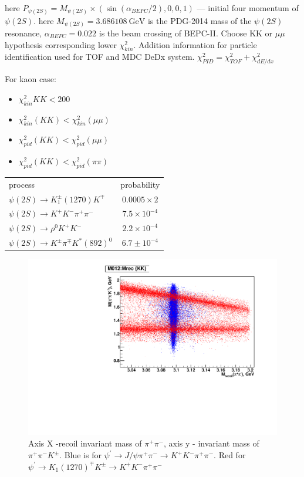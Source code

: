 \documentclass[a4paper,12pt]{article}
\begin{document}
here  $P_{\psi(2S)} = M_{\psi(2S)}\times (\sin(\alpha_{BEPC}/2),0,0, 1)$ ---
initial four momentum of $\psi(2S)$.  here $M_{\psi(2S)} = 3.686108\
\mbox{GeV}$ is the PDG-2014 mass of the $\psi(2S)$ resonance,
$\alpha_{BEPC}=0.022$ is the beam crossing of BEPC-II. Choose KK or $\mu\mu$
hypothesis corresponding lower $\chi^2_{kin}$. Addition information for
particle identification used for TOF and MDC DeDx system.
$\chi^2_{PID} = \chi^2_{TOF} + \chi^2_{dE/dx}$

For kaon case:
\begin{itemize}
	\item $\chi^2_{kin}{KK} <200$
	\item $\chi^2_{kin}(KK) < \chi^2_{kin}(\mu\mu)$
	\item $\chi^2_{pid}(KK) < \chi^2_{pid}(\mu\mu)$
	\item $\chi^2_{pid}(KK) < \chi^2_{pid}(\pi\pi)$
\end{itemize}


\begin{table}
	\begin{tabular}{lc} \hline
		process &  probability \\ 
		$\psi(2S) \to K_1^{\pm}(1270) K^{\mp}$  & $0.0005 \times 2$ \\ 
		$\psi(2S) \to K^+K^-\pi^+\pi^-$   & $7.5 \times 10^{-4}$  \\
		$\psi(2S) \to \rho^0 K^+K^-$   & $2.2 \times 10^{-4}$  \\
	$\psi(2S) \to  K^\pm \pi^\mp K^{*}(892)^0$  &  $6.7\pm10^{-4}$
	\end{tabular}
\end{table}


\begin{figure}
	\includegraphics[width=\textwidth]{fig/M012_Mrec-color.pdf}
	\caption{Axis X -recoil invariant mass of $\pi^+\pi^-$,  axis y - invariant
	mass of $\pi^+\pi^-K^\pm$.  Blue is for $\psi^\prime \to J/\psi \pi^+\pi^-
	\to K^+K^-\pi^+\pi^-$. Red for $\psi^\prime \to K_1(1270)^\mp K^\pm  \to
	K^+K^-\pi^+\pi^-$}
\end{figure}
\end{document}
